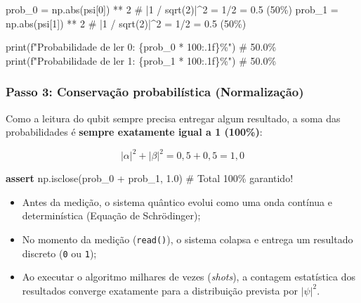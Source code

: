 \documentclass[
  brazilian,
]{report}
\newenvironment{Shaded}{\begin{snugshade}}{\end{snugshade}}
\newcommand{\BuiltInTok}[1]{\textcolor[rgb]{0.00,0.23,0.31}{#1}}
\newcommand{\CommentTok}[1]{\textcolor[rgb]{0.37,0.37,0.37}{#1}}
\newcommand{\ControlFlowTok}[1]{\textcolor[rgb]{0.00,0.23,0.31}{\textbf{#1}}}
\newcommand{\DecValTok}[1]{\textcolor[rgb]{0.68,0.00,0.00}{#1}}
\newcommand{\FloatTok}[1]{\textcolor[rgb]{0.68,0.00,0.00}{#1}}
\newcommand{\NormalTok}[1]{\textcolor[rgb]{0.00,0.23,0.31}{#1}}
\newcommand{\OperatorTok}[1]{\textcolor[rgb]{0.37,0.37,0.37}{#1}}
\newcommand{\SpecialCharTok}[1]{\textcolor[rgb]{0.37,0.37,0.37}{#1}}
\newcommand{\SpecialStringTok}[1]{\textcolor[rgb]{0.13,0.47,0.30}{#1}}
\providecommand{\tightlist}{%
  \setlength{\itemsep}{0pt}\setlength{\parskip}{0pt}}
\begin{document}
\begin{Shaded}
\begin{Highlighting}[]
\NormalTok{prob\_0 }\OperatorTok{=}\NormalTok{ np.}\BuiltInTok{abs}\NormalTok{(psi[}\DecValTok{0}\NormalTok{]) }\OperatorTok{**} \DecValTok{2}  \CommentTok{\# |1 / sqrt(2)|\^{}2 = 1/2 = 0.5 (50\%)}
\NormalTok{prob\_1 }\OperatorTok{=}\NormalTok{ np.}\BuiltInTok{abs}\NormalTok{(psi[}\DecValTok{1}\NormalTok{]) }\OperatorTok{**} \DecValTok{2}  \CommentTok{\# |1 / sqrt(2)|\^{}2 = 1/2 = 0.5 (50\%)}

\BuiltInTok{print}\NormalTok{(}\SpecialStringTok{f"Probabilidade de ler 0: }\SpecialCharTok{\{}\NormalTok{prob\_0 }\OperatorTok{*} \DecValTok{100}\SpecialCharTok{:.1f\}}\SpecialStringTok{\%"}\NormalTok{)  }\CommentTok{\# 50.0\%}
\BuiltInTok{print}\NormalTok{(}\SpecialStringTok{f"Probabilidade de ler 1: }\SpecialCharTok{\{}\NormalTok{prob\_1 }\OperatorTok{*} \DecValTok{100}\SpecialCharTok{:.1f\}}\SpecialStringTok{\%"}\NormalTok{)  }\CommentTok{\# 50.0\%}
\end{Highlighting}
\end{Shaded}

\subsubsection{Passo 3: Conservação probabilística
(Normalização)}\label{passo-3-conservauxe7uxe3o-probabiluxedstica-normalizauxe7uxe3o}

Como a leitura do qubit sempre precisa entregar algum resultado, a soma
das probabilidades é \textbf{sempre exatamente igual a 1 (100\%)}:

\[
|\alpha|^2 + |\beta|^2 = 0{,}5 + 0{,}5 = 1{,}0
\]

\begin{Shaded}
\begin{Highlighting}[]
\ControlFlowTok{assert}\NormalTok{ np.isclose(prob\_0 }\OperatorTok{+}\NormalTok{ prob\_1, }\FloatTok{1.0}\NormalTok{)  }\CommentTok{\# Total 100\% garantido!}
\end{Highlighting}
\end{Shaded}

\begin{itemize}
\tightlist
\item
  Antes da medição, o sistema quântico evolui como uma onda contínua e
  determinística (Equação de Schrödinger);
\item
  No momento da medição (\texttt{read()}), o sistema colapsa e entrega
  um resultado discreto (\texttt{0} ou \texttt{1});
\item
  Ao executar o algoritmo milhares de vezes (\emph{shots}), a contagem
  estatística dos resultados converge exatamente para a distribuição
  prevista por \(|\psi|^2\).
\end{itemize}
\end{document}
